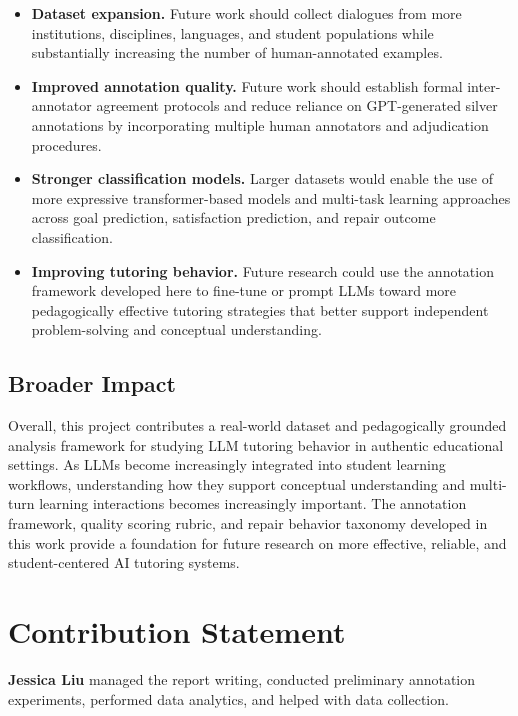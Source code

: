 \begin{itemize}
    \item \textbf{Dataset expansion.} Future work should collect dialogues from more institutions, disciplines, languages, and student populations while substantially increasing the number of human-annotated examples.

    \item \textbf{Improved annotation quality.} Future work should establish formal inter-annotator agreement protocols and reduce reliance on GPT-generated silver annotations by incorporating multiple human annotators and adjudication procedures.

    \item \textbf{Stronger classification models.} Larger datasets would enable the use of more expressive transformer-based models and multi-task learning approaches across goal prediction, satisfaction prediction, and repair outcome classification.

    \item \textbf{Improving tutoring behavior.} Future research could use the annotation framework developed here to fine-tune or prompt LLMs toward more pedagogically effective tutoring strategies that better support independent problem-solving and conceptual understanding.
\end{itemize}

\subsection{Broader Impact}

Overall, this project contributes a real-world dataset and pedagogically grounded analysis framework for studying LLM tutoring behavior in authentic educational settings. As LLMs become increasingly integrated into student learning workflows, understanding how they support conceptual understanding and multi-turn learning interactions becomes increasingly important. The annotation framework, quality scoring rubric, and repair behavior taxonomy developed in this work provide a foundation for future research on more effective, reliable, and student-centered AI tutoring systems.

\section{Contribution Statement}

\textbf{Jessica Liu} managed the report writing, conducted preliminary annotation experiments, performed data analytics, and helped with data collection.

